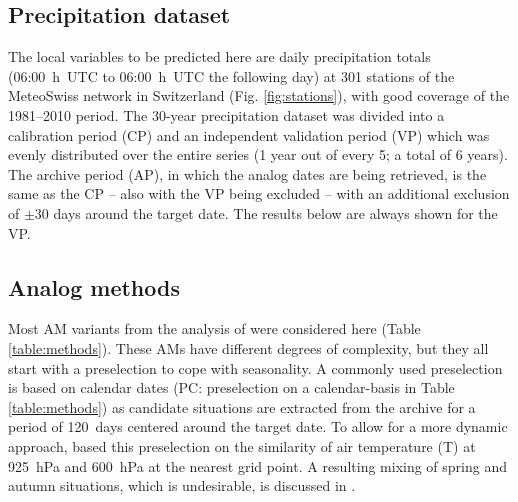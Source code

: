 \documentclass[alpha-refs]{wiley-article}
\begin{document}
\subsection{Precipitation dataset}
\label{sec:precipitation}

The local variables to be predicted here are daily precipitation totals (06:00~h~UTC to 06:00~h~UTC the following day) at 301 stations of the MeteoSwiss network in Switzerland (Fig. \ref{fig:stations}), with good coverage of the 1981--2010 period. The 30-year precipitation dataset was divided into a calibration period (CP) and an independent validation period (VP) which was evenly distributed over the entire series (1 year out of every 5; a total of 6 years). The archive period (AP), in which the analog dates are being retrieved, is the same as the CP -- also with the VP being excluded -- with an additional exclusion of $\pm30$ days around the target date. The results below are always shown for the VP.


\subsection{Analog methods}
\label{sec:ams}

Most AM variants from the analysis of \cite{Horton2018b} were considered here (Table \ref{table:methods}). These AMs have different degrees of complexity, but they all start with a preselection to cope with seasonality. A commonly used preselection is based on calendar dates (PC: preselection on a calendar-basis in Table \ref{table:methods}) as candidate situations are extracted from the archive for a period of 120~days centered around the target date. To allow for a more dynamic approach, \citet{BenDaoud2016} based this preselection on the similarity of air temperature (T) at 925~hPa and 600~hPa at the nearest grid point. A resulting mixing of spring and autumn situations, which is undesirable, is discussed in \citet{Caillouet2016}. 
\end{document}
